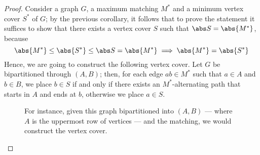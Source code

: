 \documentclass[a4paper, 12pt]{report}
\begin{document}
    \begin{proof}
        Consider a graph $G$, a maximum matching $M^*$ and a minimum vertex cover $S^*$ of $G$; by the previous corollary, it follows that to prove the statement it suffices to show that there exists a vertex cover $S$ such that $\abs S = \abs{M^*}$, because $$\abs{M^*} \le \abs{S^*} \le \abs S = \abs{M^*} \implies \abs{M^*} = \abs{S^*}$$ Hence, we are going to construct the following vertex cover. Let $G$ be bipartitioned through $(A, B)$; then, for each edge $ab \in M^*$ such that $a \in A$ and $b \in B$, we place $b \in S$ if and only if there exists an $M^*$-alternating path that starts in $A$ and ends at $b$, otherwise we place $a \in S$.

        \begin{figure}[H]
            \centering
            \caption{For instance, given this graph bipartitioned into $(A, B)$ --- where $A$ is the uppermost row of vertices --- and the  matching, we would construct the  vertex cover.}
        \end{figure}


\end{proof}
\end{document}
